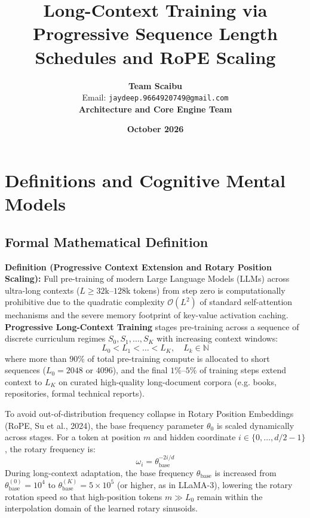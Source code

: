 \documentclass[11pt,a4paper]{article}
\title{\textbf{Long-Context Training via Progressive Sequence Length Schedules and RoPE Scaling}}
\author{\textbf{Team Scaibu} \\ \small Email: \texttt{jaydeep.9664920749@gmail.com} \\ \small \textbf{Architecture and Core Engine Team}}
\date{\textbf{October 2026}}
\theoremstyle{definition}
\begin{document}
\maketitle

\section{Definitions and Cognitive Mental Models}

\subsection{Formal Mathematical Definition}
\textbf{Definition (Progressive Context Extension and Rotary Position Scaling):}
Full pre-training of modern Large Language Models (LLMs) across ultra-long contexts ($L \ge 32\text{k}\text{--}128\text{k}$ tokens) from step zero is computationally prohibitive due to the quadratic complexity $\mathcal{O}(L^2)$ of standard self-attention mechanisms and the severe memory footprint of key-value activation caching. \textbf{Progressive Long-Context Training} stages pre-training across a sequence of discrete curriculum regimes $S_0, S_1, \dots, S_K$ with increasing context windows:
{\boldmath
\begin{equation}
L_0 < L_1 < \dots < L_K, \quad L_k \in \mathbb{N}
\end{equation}
}
where more than $90\%$ of total pre-training compute is allocated to short sequences ($L_0 = 2048$ or $4096$), and the final $1\%\text{--}5\%$ of training steps extend context to $L_K$ on curated high-quality long-document corpora (e.g. books, repositories, formal technical reports).

To avoid out-of-distribution frequency collapse in Rotary Position Embeddings (RoPE, Su et al., 2024), the base frequency parameter $\theta_0$ is scaled dynamically across stages. For a token at position $m$ and hidden coordinate $i \in \{0, \dots, d/2 - 1\}$, the rotary frequency is:
{\boldmath
\begin{equation}
\omega_i = \theta_{\text{base}}^{-2i / d}
\end{equation}
}
During long-context adaptation, the base frequency $\theta_{\text{base}}$ is increased from $\theta_{\text{base}}^{(0)} = 10^4$ to $\theta_{\text{base}}^{(K)} = 5 \times 10^5$ (or higher, as in LLaMA-3), lowering the rotary rotation speed so that high-position tokens $m \gg L_0$ remain within the interpolation domain of the learned rotary sinusoids.
\end{document}

